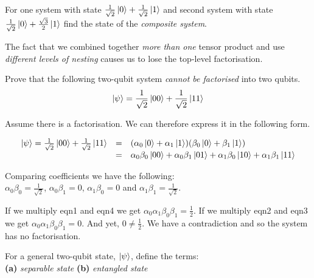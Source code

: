 \begin{example}
For one system with state $\frac{1}{\sqrt{2}} \left|0\right\rangle + \frac{1}{\sqrt{2}} \left|1\right\rangle$
and second system with state $\frac{1}{\sqrt{2}} \left|0\right\rangle + \frac{\sqrt{3}}{2} \left|1\right\rangle$ 
find the state of the \textit{composite system}.
\end{example}


\frmrule

The fact that we combined together \textit{more than one} tensor product 
and use \textit{different levels of nesting} causes us to lose the 
top-level factorisation. 


\begin{example}
Prove that the following two-qubit system \textit{cannot be factorised}
into two qubits. 
$$\left|\psi\right\rangle = \frac{1}{\sqrt{2}} \left|00\right\rangle + \frac{1}{\sqrt{2}} \left|11\right\rangle$$
\end{example}

\frmrule

Assume there is a factorisation. We can therefore express it in the following form. 

\[ \begin{array}{lll}
\left|\psi\right\rangle = \frac{1}{\sqrt{2}} \left|00\right\rangle + \frac{1}{\sqrt{2}} \left|11\right\rangle 
& = & (\alpha_0 \left|0\right\rangle + \alpha_1 \left|1\right\rangle)(\beta_0 \left|0\right\rangle + \beta_1 \left|1\right\rangle) \\
& = & \alpha_0 \beta_0 \left|00\right\rangle + 
\alpha_0 \beta_1 \left|01\right\rangle + 
\alpha_1 \beta_0 \left|10\right\rangle + 
\alpha_1 \beta_1 \left|11\right\rangle \\
\end{array}\] 

Comparing coefficients we have the following: \\
$\alpha_0 \beta_0 = \frac{1}{\sqrt{2}}$,
$\alpha_0 \beta_1 = 0$,
$\alpha_1 \beta_0 = 0$ and
$\alpha_1 \beta_1 = \frac{1}{\sqrt{2}}$.

If we multiply eqn1 and eqn4 we get $\alpha_0 \alpha_1 \beta_0 \beta_1 = \frac{1}{2}$.
If we multiply eqn2 and eqn3 we get $\alpha_0 \alpha_1 \beta_0 \beta_1 = 0$.
And yet, $0 \neq \frac{1}{2}$. We have a contradiction and so the system has no factorisation. 

\frmrule

\begin{example}
For a general two-qubit state, $\left|\psi\right\rangle$, define the terms: \\
\textbf{(a)} \textit{separable state}
\textbf{(b)} \textit{entangled state}
\end{example}

